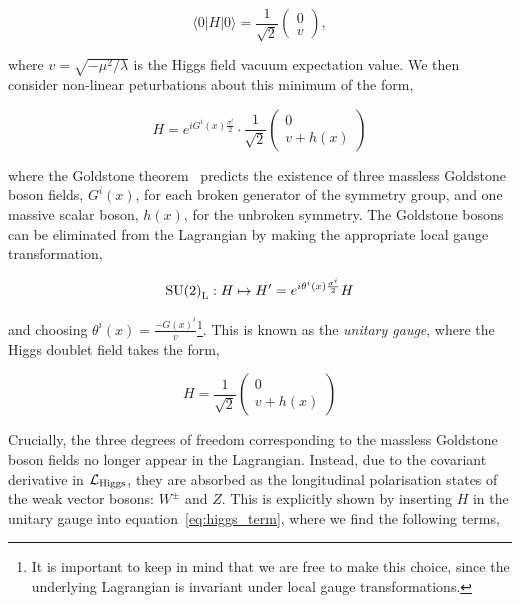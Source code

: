 \begin{equation}
    \langle 0 | H | 0 \rangle = \frac{1}{\sqrt{2}}\begin{pmatrix}
    0 \\
    v
    \end{pmatrix},
\end{equation}

\noindent
where $v=\sqrt{-\mu^2/\lambda}$ is the Higgs field vacuum expectation value. We then consider non-linear peturbations about this minimum of the form,

\begin{equation}
    H = e^{iG^i(x)\frac{\sigma^i}{2}} \cdot \frac{1}{\sqrt{2}}\begin{pmatrix}
    0 \\
    v + h(x)
    \end{pmatrix}
\end{equation}

\noindent
where the Goldstone theorem~\cite{Goldstone:1962es} predicts the existence of three massless Goldstone boson fields, $G^i(x)$, for each broken generator of the symmetry group, and one massive scalar boson, $h(x)$, for the unbroken symmetry. The Goldstone bosons can be eliminated from the Lagrangian by making the appropriate local gauge transformation,

\begin{equation}
    {\rm{SU}(2)}_{\rm{L}}: H \mapsto H' = e^{i\theta^i(x)\frac{\sigma^i}{2}}H
\end{equation}

\noindent
and choosing $\theta^i(x)=\frac{-G(x)^i}{v}$\footnote{It is important to keep in mind that we are free to make this choice, since the underlying Lagrangian is invariant under local gauge transformations.}. This is known as the \textit{unitary gauge}, where the Higgs doublet field takes the form,

\begin{equation}
    H = \frac{1}{\sqrt{2}}\begin{pmatrix}
    0 \\
    v + h(x)
    \end{pmatrix}
\end{equation}

\noindent
Crucially, the three degrees of freedom corresponding to the massless Goldstone boson fields no longer appear in the Lagrangian. Instead, due to the covariant derivative in $\mathcal{L}_{\rm{Higgs}}$, they are absorbed as the longitudinal polarisation states of the weak vector bosons: $W^{\pm}$ and $Z$. This is explicitly shown by inserting $H$ in the unitary gauge into equation~\ref{eq:higgs_term}, where we find the following terms,

